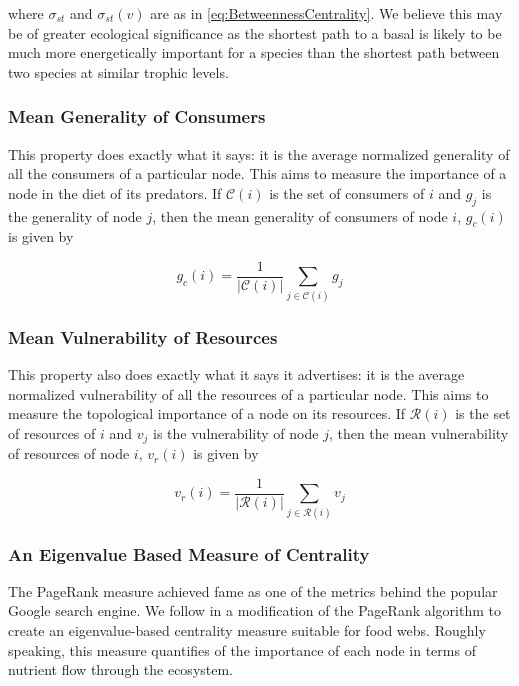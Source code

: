 \documentclass{article}
\begin{document}
where $\sigma_{st}$ and $\sigma_{st}(v)$ are as in
\ref{eq:BetweennessCentrality}. We believe this may be of greater ecological
significance as the shortest path to a basal is likely to be much more
energetically important for a species than the shortest path between two
species at similar trophic levels.

\subsubsection{Mean Generality of Consumers} This property does exactly what it
says: it is the average normalized generality of all the consumers of a
particular node. This aims to measure the importance of a node in the diet of
its predators. If $\mathcal{C}(i)$ is the set of consumers of $i$ and $g_j$ is
the generality of node $j$, then the mean generality of consumers of node $i$,
$g_c(i)$ is given by

\begin{equation} 
    g_c(i) = \frac{1}{|\mathcal{C}(i)|}\sum_{j\in\mathcal{C}(i)}g_j
\label{eq:MeanGeneralityConsumers} 
\end{equation}

\subsubsection{Mean Vulnerability of Resources} This property also does exactly
what it says it advertises: it is the average normalized vulnerability of all
the resources of a particular node. This aims to measure the topological
importance of a node on its resources. If $\mathcal{R}(i)$ is the set of
resources of $i$ and $v_j$ is the vulnerability of node $j$, then the mean
vulnerability of resources of node $i$, $v_r(i)$ is given by

\begin{equation} 
    v_r(i) = \frac{1}{|\mathcal{R}(i)|}\sum_{j\in\mathcal{R}(i)}v_j
\label{eq:MeanVulnerabilityResources}  
\end{equation}

\subsubsection{An Eigenvalue Based Measure of Centrality} The PageRank measure
achieved fame as one of the metrics behind the popular Google search engine. We
follow \cite{Allesina2009} in a modification of the PageRank algorithm to
create an eigenvalue-based centrality measure suitable for food webs.  Roughly
speaking, this measure quantifies of the importance of each node in terms of
nutrient flow through the ecosystem.
\end{document}
